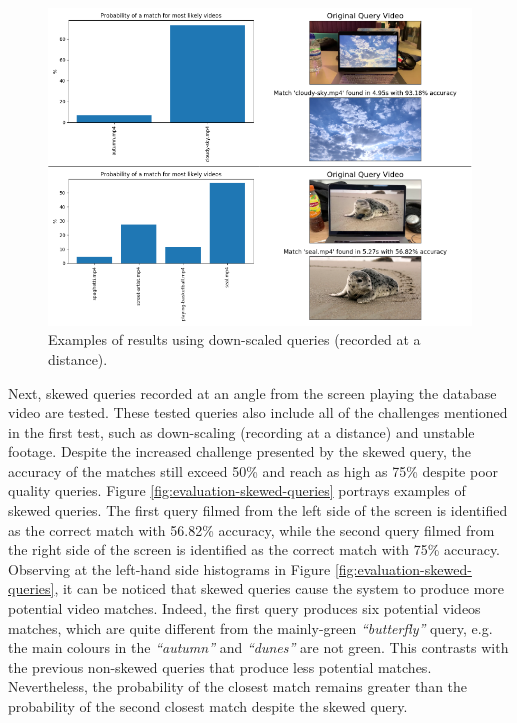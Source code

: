 \begin{figure}[h] 
\centerline{\includegraphics[width=\textwidth]{figures/evaluation/downscaled-queries.png}}
\caption{\label{fig:evaluation-downscaled-queries}Examples of results using down-scaled queries (recorded at a distance).}
\end{figure}

Next, skewed queries recorded at an angle from the screen playing the database video are tested. These tested queries also include all of the challenges mentioned in the first test, such as down-scaling (recording at a distance) and unstable footage. Despite the increased challenge presented by the skewed query, the accuracy of the matches still exceed 50\% and reach as high as 75\% despite poor quality queries. Figure \ref{fig:evaluation-skewed-queries} portrays examples of skewed queries. The first query filmed from the left side of the screen is identified as the correct match with 56.82\% accuracy, while the second query filmed from the right side of the screen is identified as the correct match with 75\% accuracy. Observing at the left-hand side histograms in Figure \ref{fig:evaluation-skewed-queries}, it can be noticed that skewed queries cause the system to produce more potential video matches. Indeed, the first query produces six potential videos matches, which are quite different from the mainly-green \textit{``butterfly''} query, e.g. the main colours in the \textit{``autumn''} and \textit{``dunes''} are not green. This contrasts with the previous non-skewed queries that produce less potential matches. Nevertheless, the probability of the closest match remains greater than the probability of the second closest match despite the skewed query. %

